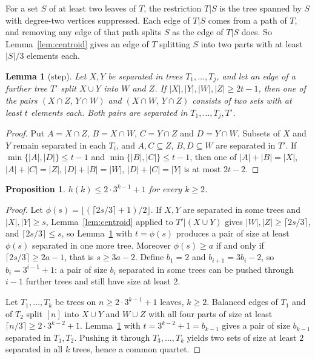 \documentclass[11pt]{amsart}
\newtheorem{lemma}[theorem]{Lemma}
\newtheorem{proposition}[theorem]{Proposition}
\theoremstyle{remark}
\begin{document}
For a set $S$ of at least two leaves of $T$, the restriction $T|S$ is the tree spanned by $S$ with degree-two vertices suppressed. Each edge of $T|S$ comes from a path of $T$, and removing any edge of that path splits $S$ as the edge of $T|S$ does. So Lemma~\ref{lem:centroid} gives an edge of $T$ splitting $S$ into two parts with at least $|S|/3$ elements each.

\begin{lemma}[step]\label{lem:step}
Let $X,Y$ be separated in trees $T_1,\dots,T_j$, and let an edge of a further tree $T'$ split $X\cup Y$ into $W$ and $Z$. If $|X|,|Y|,|W|,|Z|\ge 2t-1$, then one of the pairs $(X\cap Z,\,Y\cap W)$ and $(X\cap W,\,Y\cap Z)$ consists of two sets with at least $t$ elements each. Both pairs are separated in $T_1,\dots,T_j,T'$.
\end{lemma}

\begin{proof}
Put $A=X\cap Z$, $B=X\cap W$, $C=Y\cap Z$ and $D=Y\cap W$. Subsets of $X$ and $Y$ remain separated in each $T_i$, and $A,C\subseteq Z$, $B,D\subseteq W$ are separated in $T'$. If $\min\{|A|,|D|\}\le t-1$ and $\min\{|B|,|C|\}\le t-1$, then one of $|A|+|B|=|X|$, $|A|+|C|=|Z|$, $|D|+|B|=|W|$, $|D|+|C|=|Y|$ is at most $2t-2$.
\end{proof}

\begin{proposition}\label{prop:plain}
$h(k)\le 2\cdot3^{k-1}+1$ for every $k\ge2$.
\end{proposition}

\begin{proof}
Let $\phi(s)=\lfloor(\lceil 2s/3\rceil+1)/2\rfloor$. If $X,Y$ are separated in some trees and $|X|,|Y|\ge s$, Lemma~\ref{lem:centroid} applied to $T'|(X\cup Y)$ gives $|W|,|Z|\ge\lceil 2s/3\rceil$, and $\lceil 2s/3\rceil\le s$, so Lemma~\ref{lem:step} with $t=\phi(s)$ produces a pair of size at least $\phi(s)$ separated in one more tree. Moreover $\phi(s)\ge a$ if and only if $\lceil 2s/3\rceil\ge 2a-1$, that is $s\ge 3a-2$. Define $b_1=2$ and $b_{i+1}=3b_i-2$, so $b_i=3^{i-1}+1$: a pair of size $b_i$ separated in some trees can be pushed through $i-1$ further trees and still have size at least $2$.

Let $T_1,\dots,T_k$ be trees on $n\ge 2\cdot 3^{k-1}+1$ leaves, $k\ge2$. Balanced edges of $T_1$ and of $T_2$ split $[n]$ into $X\cup Y$ and $W\cup Z$ with all four parts of size at least $\lceil n/3\rceil\ge 2\cdot3^{k-2}+1$. Lemma~\ref{lem:step} with $t=3^{k-2}+1=b_{k-1}$ gives a pair of size $b_{k-1}$ separated in $T_1,T_2$. Pushing it through $T_3,\dots,T_k$ yields two sets of size at least $2$ separated in all $k$ trees, hence a common quartet.
\end{proof}
\end{document}
